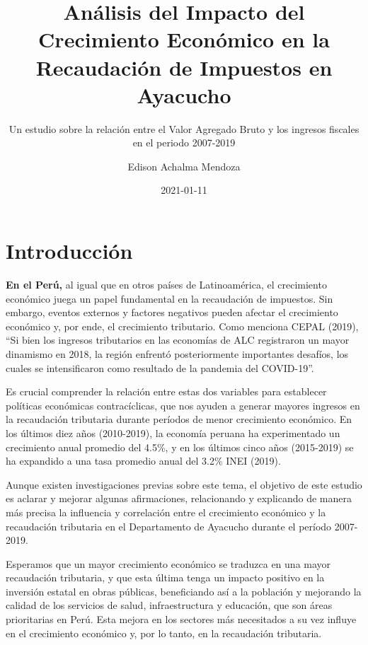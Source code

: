 \documentclass[
  letterpaper,
  DIV=11,
  numbers=noendperiod]{scrartcl}
\title{Análisis del Impacto del Crecimiento Económico en la Recaudación
de Impuestos en Ayacucho}
\subtitle{Un estudio sobre la relación entre el Valor Agregado Bruto y
los ingresos fiscales en el periodo 2007-2019}
\author{Edison Achalma Mendoza}
\date{2021-01-11}
\begin{document}
\maketitle
\ifdefined\Shaded\renewenvironment{Shaded}{\begin{tcolorbox}[borderline west={3pt}{0pt}{shadecolor}, boxrule=0pt, breakable, interior hidden, enhanced, sharp corners, frame hidden]}{\end{tcolorbox}}\fi

\hypertarget{sec-introducciuxf3n}{%
\section*{Introducción}\label{sec-introducciuxf3n}}

\textbf{En el Perú,} al igual que en otros países de Latinoamérica, el
crecimiento económico juega un papel fundamental en la recaudación de
impuestos. Sin embargo, eventos externos y factores negativos pueden
afectar el crecimiento económico y, por ende, el crecimiento tributario.
Como menciona CEPAL (2019), ``Si bien los ingresos tributarios en las
economías de ALC registraron un mayor dinamismo en 2018, la región
enfrentó posteriormente importantes desafíos, los cuales se
intensificaron como resultado de la pandemia del COVID-19''.

Es crucial comprender la relación entre estas dos variables para
establecer políticas económicas contracíclicas, que nos ayuden a generar
mayores ingresos en la recaudación tributaria durante períodos de menor
crecimiento económico. En los últimos diez años (2010-2019), la economía
peruana ha experimentado un crecimiento anual promedio del 4.5\%, y en
los últimos cinco años (2015-2019) se ha expandido a una tasa promedio
anual del 3.2\% INEI (2019).

Aunque existen investigaciones previas sobre este tema, el objetivo de
este estudio es aclarar y mejorar algunas afirmaciones, relacionando y
explicando de manera más precisa la influencia y correlación entre el
crecimiento económico y la recaudación tributaria en el Departamento de
Ayacucho durante el período 2007-2019.

Esperamos que un mayor crecimiento económico se traduzca en una mayor
recaudación tributaria, y que esta última tenga un impacto positivo en
la inversión estatal en obras públicas, beneficiando así a la población
y mejorando la calidad de los servicios de salud, infraestructura y
educación, que son áreas prioritarias en Perú. Esta mejora en los
sectores más necesitados a su vez influye en el crecimiento económico y,
por lo tanto, en la recaudación tributaria.
\end{document}
